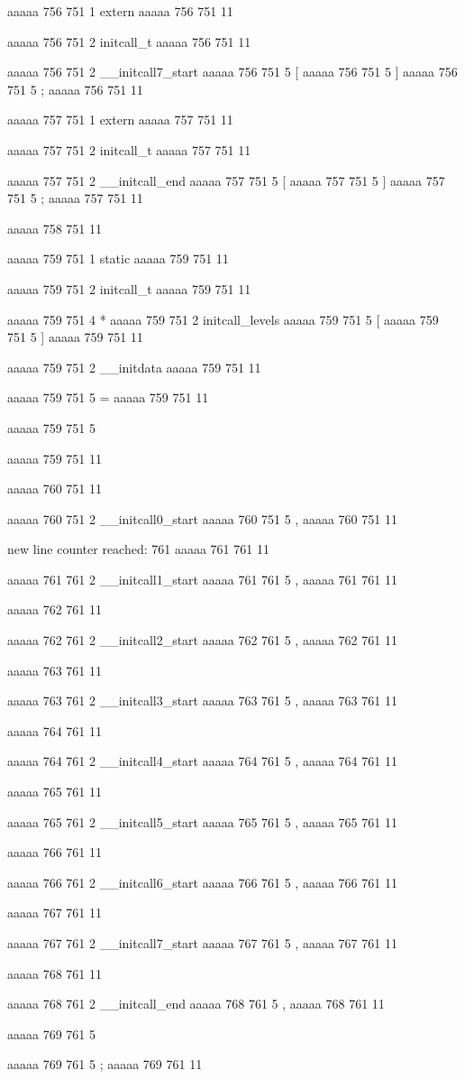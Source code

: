 aaaaa 756 751
1
extern
aaaaa 756 751
11
 
aaaaa 756 751
2
initcall_t
aaaaa 756 751
11
 
aaaaa 756 751
2
__initcall7_start
aaaaa 756 751
5
[
aaaaa 756 751
5
]
aaaaa 756 751
5
;
aaaaa 756 751
11


aaaaa 757 751
1
extern
aaaaa 757 751
11
 
aaaaa 757 751
2
initcall_t
aaaaa 757 751
11
 
aaaaa 757 751
2
__initcall_end
aaaaa 757 751
5
[
aaaaa 757 751
5
]
aaaaa 757 751
5
;
aaaaa 757 751
11


aaaaa 758 751
11


aaaaa 759 751
1
static
aaaaa 759 751
11
 
aaaaa 759 751
2
initcall_t
aaaaa 759 751
11
 
aaaaa 759 751
4
*
aaaaa 759 751
2
initcall_levels
aaaaa 759 751
5
[
aaaaa 759 751
5
]
aaaaa 759 751
11
 
aaaaa 759 751
2
__initdata
aaaaa 759 751
11
 
aaaaa 759 751
5
=
aaaaa 759 751
11
 
aaaaa 759 751
5
{
aaaaa 759 751
11


aaaaa 760 751
11
	
aaaaa 760 751
2
__initcall0_start
aaaaa 760 751
5
,
aaaaa 760 751
11


new line counter reached: 761
aaaaa 761 761
11
	
aaaaa 761 761
2
__initcall1_start
aaaaa 761 761
5
,
aaaaa 761 761
11


aaaaa 762 761
11
	
aaaaa 762 761
2
__initcall2_start
aaaaa 762 761
5
,
aaaaa 762 761
11


aaaaa 763 761
11
	
aaaaa 763 761
2
__initcall3_start
aaaaa 763 761
5
,
aaaaa 763 761
11


aaaaa 764 761
11
	
aaaaa 764 761
2
__initcall4_start
aaaaa 764 761
5
,
aaaaa 764 761
11


aaaaa 765 761
11
	
aaaaa 765 761
2
__initcall5_start
aaaaa 765 761
5
,
aaaaa 765 761
11


aaaaa 766 761
11
	
aaaaa 766 761
2
__initcall6_start
aaaaa 766 761
5
,
aaaaa 766 761
11


aaaaa 767 761
11
	
aaaaa 767 761
2
__initcall7_start
aaaaa 767 761
5
,
aaaaa 767 761
11


aaaaa 768 761
11
	
aaaaa 768 761
2
__initcall_end
aaaaa 768 761
5
,
aaaaa 768 761
11


aaaaa 769 761
5
}
aaaaa 769 761
5
;
aaaaa 769 761
11


